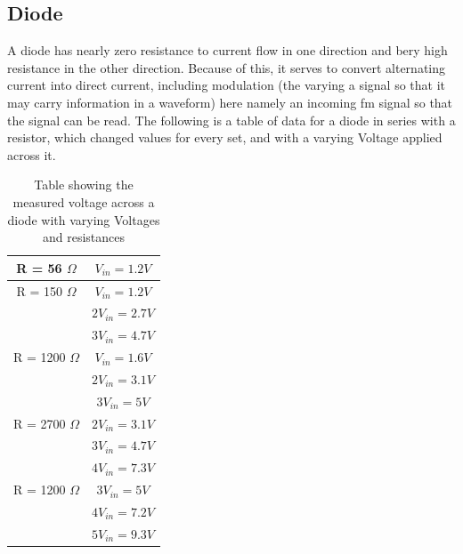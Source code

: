 \documentclass[12 pt]{article}
\begin{document}
\subsection{Diode}
A diode has nearly zero resistance to current flow in one direction and
bery high resistance in the other direction. Because of this, it serves
to convert alternating current into direct current, including modulation
(the varying a signal so that it may carry information in a waveform)
here namely an incoming fm signal so that the signal can be read. The
following is a table of data for a diode in series with a resistor,
which changed values for every set, and with a varying Voltage applied
across it.
\begin{table}[H]
\center
\begin{tabular}{|c|c|}
\hline
R = 56 $\Omega$ & $V_{in} = 1.2 V$ \\
\hline 
R = 150 $\Omega$ & $V_{in} = 1.2V$ \\
\hline
                   & $2V_{in} = 2.7V$ \\
\hline
                   & $3V_{in} = 4.7V$ \\
\hline
R = 1200 $\Omega$ & $V_{in} = 1.6V$ \\
\hline
                    & $2V_{in} = 3.1V$ \\
\hline
                    & $3V_{in} = 5V$ \\
\hline
R = 2700 $\Omega$ & $2V_{in} = 3.1V$ \\
\hline
                    & $3V_{in} = 4.7V$ \\
\hline
                    & $4V_{in} = 7.3V$ \\
\hline
R = 1200 $\Omega$ & $3V_{in} = 5V$ \\
\hline
                    & $4V_{in} = 7.2V$ \\
\hline
                    & $5V_{in} = 9.3V$ \\
\hline
\end{tabular}
\caption{Table showing the measured voltage across a diode with varying
  Voltages and resistances}
\label{tab.1}
\end{table}
\end{document}
